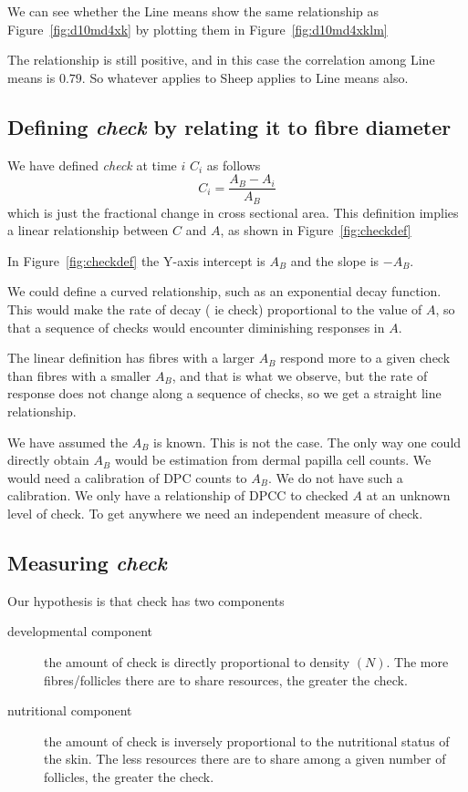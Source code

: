 \documentclass[titlepage]{article}  %
\begin{document}
We can see whether the Line means show the same relationship as Figure~\ref{fig:d10md4xk} by plotting them in Figure~\ref{fig:d10md4xklm}

The relationship is still positive, and in this case the correlation among Line means is $0.79$. So whatever applies to Sheep applies to Line means also.

\clearpage
\subsection{Defining {\em check} by relating it to fibre diameter}
We have defined {\em check} at time $i$ $C_{i}$ as follows
\begin{displaymath}
 C_{i} = \frac{A_{B} - A_{i}}{A_{B}}
\end{displaymath}
which is just the fractional change in cross sectional area. This definition implies a linear relationship between $C$ and $A$, as shown in Figure~\ref{fig:checkdef}

In Figure~\ref{fig:checkdef} the Y-axis intercept is $A_{B}$ and the slope is $-A_{B}$. 

We could define a curved relationship, such as an exponential decay function. This would make the rate of decay ( ie check) proportional to the value of $A$, so that a sequence of checks would encounter diminishing responses in $A$. 

The linear definition has fibres with a larger $A_{B}$ respond more to a given check than fibres with a smaller $A_{B}$, and that is what we observe,  but the rate of response does not change along a sequence of checks, so we get a straight line relationship. 

We have assumed the $A_{B}$ is known. This is not the case. The only way one could directly obtain $A_{B}$ would be estimation from dermal papilla cell counts. We would need a calibration of DPC counts to $A_{B}$. We do not have such a calibration. We only have a relationship of DPCC to checked $A$ at an unknown level of check. To get anywhere we need an independent measure of check.

\subsection{Measuring {\em check}}
Our hypothesis is that check has two components
\begin{description}
\item[developmental component] the amount of check is directly proportional to density $(N)$. The more fibres/follicles there are to share resources, the greater the check.
\item[nutritional component] the amount of check is inversely proportional to the nutritional status of the skin. The less resources there are to share among a given number of follicles, the greater the check.
\end{description}
\end{document}

